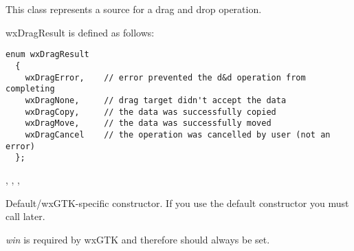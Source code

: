 \section{}\label{wxdropsource}


This class represents a source for a drag and drop operation.




wxDragResult is defined as follows:

{\small\begin{verbatim}
enum wxDragResult
  {
    wxDragError,    // error prevented the d&d operation from completing
    wxDragNone,     // drag target didn't accept the data
    wxDragCopy,     // the data was successfully copied
    wxDragMove,     // the data was successfully moved
    wxDragCancel    // the operation was cancelled by user (not an error)
  };
\end{verbatim}%
}


, , 
, 


\label{wxdropsourcewxdropsource}


Default/wxGTK-specific constructor. If you use the default constructor you must
call  later.

{\it win} is required by wxGTK and therefore should always be set.





\label{wxdropsourcedtor}


